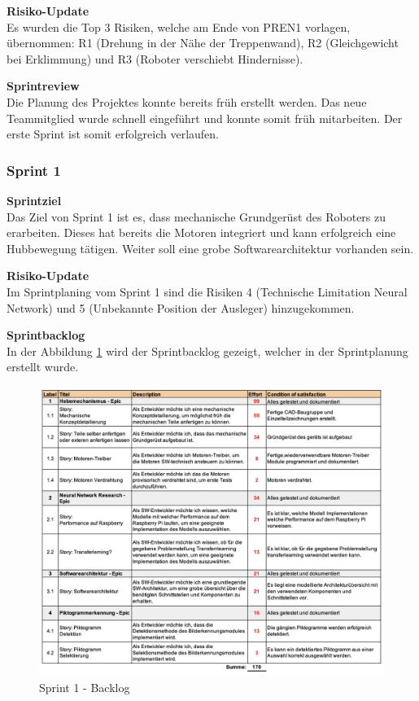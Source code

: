 \textbf{Risiko-Update}\\
Es wurden die Top 3 Risiken, welche am Ende von PREN1 vorlagen, übernommen: R1 (Drehung in der Nähe der Treppenwand), R2 (Gleichgewicht bei Erklimmung) und R3 (Roboter verschiebt Hindernisse).

\textbf{Sprintreview}\\
Die Planung des Projektes konnte bereits früh erstellt werden. Das neue Teammitglied wurde schnell eingeführt und konnte somit früh mitarbeiten. Der erste Sprint ist somit erfolgreich verlaufen.

\subsubsection{Sprint 1}
\textbf{Sprintziel}\\
Das Ziel von Sprint 1 ist es, dass mechanische Grundgerüst des Roboters zu erarbeiten. Dieses hat bereits die Motoren integriert und kann erfolgreich eine Hubbewegung tätigen. Weiter soll eine grobe Softwarearchitektur vorhanden sein.

\textbf{Risiko-Update}\\
Im Sprintplaning vom Sprint 1 sind die Risiken 4 (Technische Limitation Neural Network) und 5 (Unbekannte Position der Ausleger) hinzugekommen. 

\textbf{Sprintbacklog}\\
In der Abbildung \ref{fig:sprint-backlog-1} wird der Sprintbacklog gezeigt, welcher in der Sprintplanung erstellt wurde.
\begin{figure}[H]
  \includegraphics[width=1.0\textwidth]{img/projektmanagement/Sprint 1.png}
  \centering
  \caption{Sprint 1 - Backlog}
  \label{fig:sprint-backlog-1}
\end{figure}

